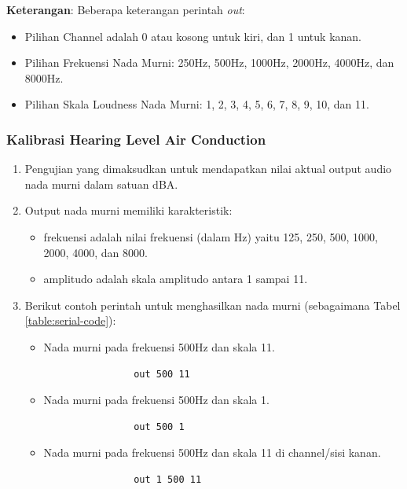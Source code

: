\documentclass{article}
\begin{document}
	\textbf{Keterangan}: Beberapa keterangan perintah \textit{out}:
	\begin{itemize}
		\item Pilihan Channel adalah 0 atau kosong untuk kiri, dan 1 untuk kanan.
		\item Pilihan Frekuensi Nada Murni: 250Hz, 500Hz, 1000Hz, 2000Hz, 4000Hz, dan 8000Hz.
		\item Pilihan Skala Loudness Nada Murni: 1, 2, 3, 4, 5, 6, 7, 8, 9, 10, dan 11.
	\end{itemize}
	
	\subsubsection{Kalibrasi Hearing Level Air Conduction}
	\label{subsubsec:hl}
	\begin{enumerate}
		\item Pengujian yang dimaksudkan untuk mendapatkan nilai aktual output audio nada murni dalam satuan dBA.
		
		\item Output nada murni memiliki karakteristik:
		\begin{itemize}
			\item frekuensi adalah nilai frekuensi (dalam Hz) yaitu 125, 250, 500, 1000, 2000, 4000, dan 8000.
			\item amplitudo adalah skala amplitudo antara 1 sampai 11.
		\end{itemize}
		
		\item Berikut contoh perintah untuk menghasilkan nada murni (sebagaimana Tabel \ref{table:serial-code}):
		
		\begin{itemize}
			\item Nada murni pada frekuensi 500Hz dan skala 11.
			\begin{verbatim}
				out 500 11
			\end{verbatim}
			
			\item Nada murni pada frekuensi 500Hz dan skala 1.
			\begin{verbatim}
				out 500 1
			\end{verbatim}
			
			\item Nada murni pada frekuensi 500Hz dan skala 11 di channel/sisi kanan.
			\begin{verbatim}
				out 1 500 11
			\end{verbatim}
			

\end{itemize}
\end{enumerate}
\end{document}
